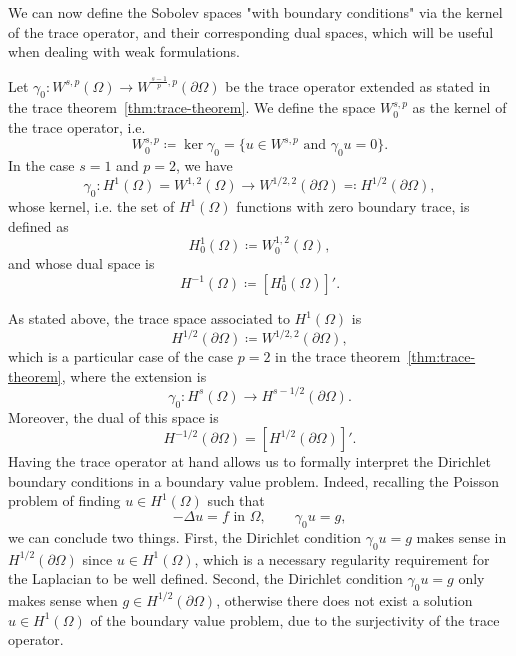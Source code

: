 We can now define the Sobolev spaces "with boundary conditions" via the kernel of the trace operator, and their corresponding dual spaces, which will be useful when dealing with weak formulations.
\begin{definition}\label{def:sobolev-spaces-zerobc}
    Let $\gamma_0: W^{s,p}(\Omega) \to W^{\frac{s-1}{p}, p}(\partial\Omega)$ be the trace operator extended as stated in the trace theorem~\ref{thm:trace-theorem}. We define the space $W_0^{s,p}$ as the kernel of the trace operator, i.e. %
    \begin{equation}\label{eq:def-W0sp}
        W_0^{s,p} \coloneqq \ker \gamma_0 = \{ u \in W^{s,p} \text{ and } \gamma_0 u = 0 \}.
    \end{equation}
    In the case $s=1$ and $p=2$, we have
    \begin{equation*}
        \gamma_0: H^1(\Omega)=W^{1,2}(\Omega)\to W^{1/2,2}(\partial\Omega) \eqqcolon H^{1/2}(\partial\Omega),
    \end{equation*}
    whose kernel, i.e. the set of $H^1(\Omega)$ functions with zero boundary trace, is defined as
    \begin{equation}\label{def:H_0^1}
        H_0^1(\Omega) \coloneqq W_0^{1,2}(\Omega),
    \end{equation}
    and whose dual space is 
    \begin{equation}\label{def:H^-1}
        H^{-1}(\Omega) \coloneqq [H_0^1(\Omega)]'.
    \end{equation}
\end{definition} 
As stated above, the trace space associated to $H^1(\Omega)$ is 
\begin{equation}
    H^{1/2}(\partial\Omega) \coloneqq W^{1/2,2}(\partial\Omega),
\end{equation}
which is a particular case of the case $p=2$ in the trace theorem~\ref{thm:trace-theorem}, where the extension is 
\begin{equation*}
    \gamma_0: H^{s}(\Omega) \to H^{s-1/2}(\partial\Omega).
\end{equation*}
Moreover, the dual of this space is 
\begin{equation}
    H^{-1/2}(\partial\Omega) = [H^{1/2}(\partial\Omega)]'.
\end{equation}
Having the trace operator at hand allows us to formally interpret the Dirichlet boundary conditions in a boundary value problem. Indeed, recalling the Poisson problem of finding $u\in H^1(\Omega)$ such that
\begin{equation*}
    -\Delta u = f \text{  in }\Omega, \qquad \gamma_0 u = g,
\end{equation*}
we can conclude two things. First, the Dirichlet condition $\gamma_0 u = g$ makes sense in $H^{1/2}(\partial\Omega)$ since $u\in H^1(\Omega)$, which is a necessary regularity requirement for the Laplacian to be well defined. Second, the Dirichlet condition $\gamma_0 u = g$ only makes sense when $g\in H^{1/2}(\partial\Omega)$, otherwise there does not exist a solution $u\in H^1(\Omega)$ of the boundary value problem, due to the surjectivity of the trace operator. %
